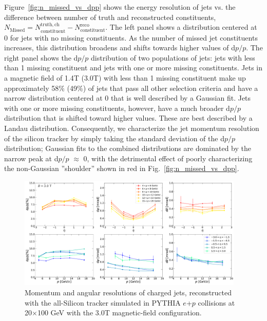 Figure~\ref{fig:n_missed_vs_dpp} shows the energy resolution of jets vs. the difference between number of truth and reconstructed constituents, $N_\mathrm{Missed} = N_\mathrm{constituent}^\mathrm{truth,ch} - N_\mathrm{constituent}^\mathrm{reco}$. 
The left panel shows a distribution centered at 0 for jets with no missing constituents. As the number of missed jet constituents increases, this distribution broadens and shifts towards higher values of d$p/p$. The right panel shows the d$p/p$ distribution of two populations of jets: jets with less than 1 missing constituent and jets with one or more missing constituents. Jets in a magnetic field of 1.4T (3.0T) with less than 1 missing constituent make up approximately 58\% (49\%) of jets that pass all other selection criteria and have a narrow distribution centered at 0 that is well described by a Gaussian fit. Jets with one or more missing constituents, however, have a much broader d$p/p$ distribution that is shifted toward higher values. These are best described by a Landau distribution. Consequently, we characterize the jet momentum resolution of the silicon tracker by simply taking the standard deviation of the d$p/p$ distribution; 
Gaussian fits to the combined distributions are dominated by the narrow peak at d$p/p$ $\approx$ 0, with the detrimental effect of poorly characterizing the non-Gaussian ''shoulder'' shown in red in Fig.~\ref{fig:n_missed_vs_dpp}.


\begin{figure}[htbp]
    \centering
    \includegraphics[width=0.96\textwidth]{EIC_Jets/DeltaR_B_3.0_resolutions_eta_mom.pdf}
    \caption{Momentum and angular resolutions of charged jets, reconstructed with the all-Silicon tracker simulated in PYTHIA $e$+$p$ collisions at 20$\times$100 GeV with the 3.0T magnetic-field configuration.}
    \label{fig:3T_jet_resolutions}
\end{figure}

